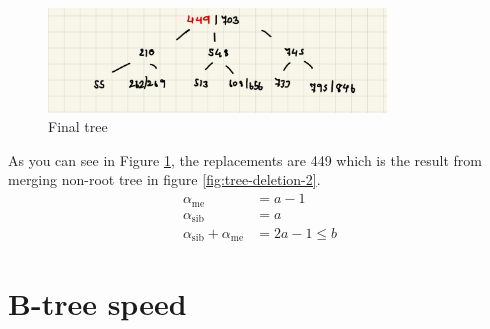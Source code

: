 \documentclass[a4paper, 12pt]{report}
\begin{document}
\begin{figure}[h]
        \centering
        \includegraphics[width=0.8\textwidth,scale=0.5]{tree_deletion_3.jpeg}
        \caption{\label{fig:tree-deletion-3} Final tree}
\end{figure}


As you can see in Figure \ref{fig:tree-deletion-3}, the replacements are 449 which is the result from merging 
non-root tree in figure \ref{fig:tree-deletion-2}.
\begin{align*}
        \alpha_{\text{me}} &= a - 1 \\
        \alpha_{\text{sib}} &= a \\
        \alpha_{\text{sib}} + \alpha_{\text{me}} &= 2a - 1 \leq b
\end{align*} 


\chapter{B-tree speed}
\end{document}
